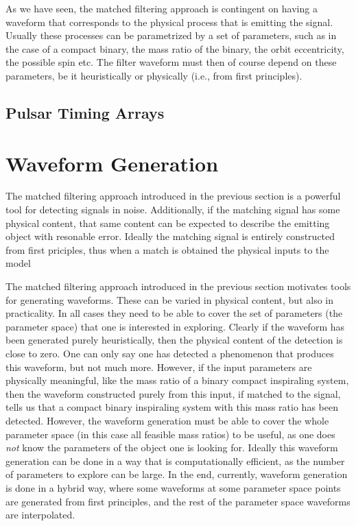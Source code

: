 \documentclass[
  letterpaper,
  DIV=11,
  numbers=noendperiod,
  oneside]{scrreprt}
\begin{document}
As we have seen, the matched filtering approach is contingent on having
a waveform that corresponds to the physical process that is emitting the
signal. Usually these processes can be parametrized by a set of
parameters, such as in the case of a compact binary, the mass ratio of
the binary, the orbit eccentricity, the possible spin etc. The filter
waveform must then of course depend on these parameters, be it
heuristically or physically (i.e., from first principles).

\hypertarget{pulsar-timing-arrays}{%
\section{Pulsar Timing Arrays}\label{pulsar-timing-arrays}}


\hypertarget{waveform-generation}{%
\chapter{Waveform Generation}\label{waveform-generation}}

The matched filtering approach introduced in the previous section is a
powerful tool for detecting signals in noise. Additionally, if the
matching signal has some physical content, that same content can be
expected to describe the emitting object with resonable error. Ideally
the matching signal is entirely constructed from first priciples, thus
when a match is obtained the physical inputs to the model

The matched filtering approach introduced in the previous section
motivates tools for generating waveforms. These can be varied in
physical content, but also in practicality. In all cases they need to be
able to cover the set of parameters (the parameter space) that one is
interested in exploring. Clearly if the waveform has been generated
purely heuristically, then the physical content of the detection is
close to zero. One can only say one has detected a phenomenon that
produces this waveform, but not much more. However, if the input
parameters are physically meaningful, like the mass ratio of a binary
compact inspiraling system, then the waveform constructed purely from
this input, if matched to the signal, tells us that a compact binary
inspiraling system with this mass ratio has been detected. However, the
waveform generation must be able to cover the whole parameter space (in
this case all feasible mass ratios) to be useful, as one does \emph{not}
know the parameters of the object one is looking for. Ideally this
waveform generation can be done in a way that is computationally
efficient, as the number of parameters to explore can be large. In the
end, currently, waveform generation is done in a hybrid way, where some
waveforms at some parameter space points are generated from first
principles, and the rest of the parameter space waveforms are
interpolated.
\end{document}
